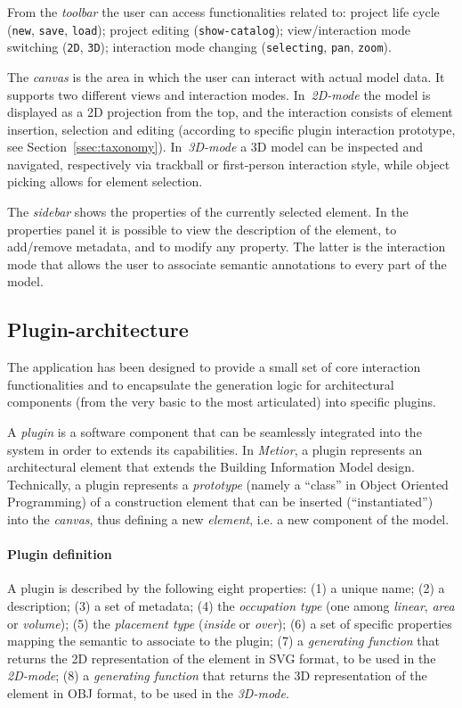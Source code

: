 \documentclass[a4paper,twoside]{article}
\begin{document}
From the \emph{toolbar} the user can access functionalities related to: project life cycle ({\tt new}, {\tt save}, {\tt load}); project editing  ({\tt  show-catalog}); view/interaction mode switching ({\tt 2D}, {\tt  3D}); interaction mode changing ({\tt  selecting}, {\tt pan}, {\tt zoom}).


The \emph{canvas} is the area in which the user can interact with actual model data. It supports two different views and interaction modes. In~\emph{2D-mode} the model is displayed as a 2D projection from the top, and the interaction consists of element insertion, selection and editing (according to specific plugin interaction prototype, see Section~\ref{ssec:taxonomy}). In~\emph{3D-mode} a 3D model can be inspected and navigated, respectively via trackball or first-person interaction style, while object picking allows for element selection.

The \emph{sidebar} shows the properties of the currently selected element.
In the properties panel it is possible to view the description of the element, to add/remove metadata, and to modify any property. The latter is the interaction mode that allows the user to associate semantic annotations to every part of the model.

\subsection{Plugin-architecture}

\noindent
The application has been designed to provide a small set of core interaction functionalities and to encapsulate the generation logic for architectural components (from the very basic to the most articulated) into specific plugins.

A \emph{plugin} is a software component that can be seamlessly integrated into the system in order to extends its capabilities.
In \emph{Metior}, a plugin represents an architectural element that extends the Building Information Model design.
Technically, a plugin represents a \emph{prototype} (namely a ``class'' in Object Oriented Programming) of a construction element that can be inserted (``instantiated'') into the \emph{canvas}, thus defining a new \emph{element}, i.e. a new component of the model.

\paragraph{Plugin definition}

\noindent
A plugin is described by the following eight properties: (1) a unique name; (2) a description; (3) a set of metadata; (4) the \emph{occupation type} (one among \emph{linear}, \emph{area} or \emph{volume}); (5) the \emph{placement type} (\emph{inside} or \emph{over}); (6) a set of specific properties mapping the semantic to associate to the plugin; (7) a \emph{generating function} that returns the 2D representation of the element in SVG format, to be used in the \emph{2D-mode}; (8) a \emph{generating function} that returns the 3D representation of the element in OBJ format, to be used in the \emph{3D-mode}.
\end{document}
